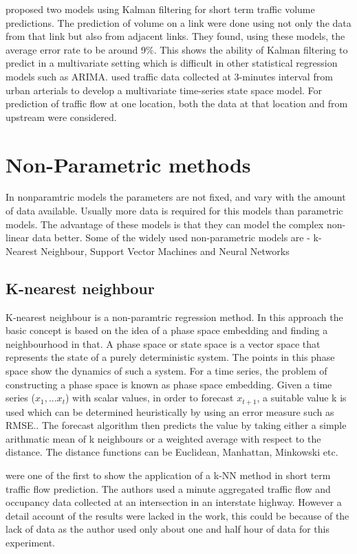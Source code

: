 \citet{okutani1984dynamic} proposed two models using Kalman filtering for short term traffic volume
predictions. The prediction of volume on a link were done using not only the data from that link but
also from adjacent links. They found, using these models, the average error rate to be around 9\%.
This shows the ability of Kalman filtering to predict in a multivariate setting which is difficult in
other statistical regression models such as ARIMA. \citet{stathopoulos2003multivariate} used traffic
data collected at 3-minutes interval from urban arterials to develop a multivariate time-series
state space model. For prediction of traffic flow at one location, both the data at that location
and from upstream were considered.

\section{Non-Parametric methods}
In nonparamtric models the parameters are not fixed, and vary with the amount of data available.
Usually more data is required for this models than parametric models. The advantage of these models
is that they can model the complex non-linear data better. Some of the widely used non-parametric
models are - k-Nearest Neighbour, Support Vector Machines and Neural Networks

\subsection{K-nearest neighbour}
K-nearest neighbour is a non-paramtric regression method. In this approach the basic concept is based
on the idea of a phase space embedding and finding a neighbourhood in that. A phase space or state
space is a vector space that represents the state of a purely deterministic system. The points in this
phase space show the dynamics of such a system. For a time series, the problem of constructing a phase
space is known as phase space embedding. Given a time series ($x_{1},...x_{t}$) with scalar values,
in order to forecast $x_{t+1}$, a suitable value k is used which can be determined heuristically by
using an error measure such as RMSE.. The forecast algorithm then predicts the value by taking either
a simple arithmatic mean of k neighbours or a weighted average with respect to the distance. The
distance functions can be Euclidean, Manhattan, Minkowski etc.

\citet{davis1991nonparametric} were one of the first to show the application of a k-NN method in short
term traffic flow prediction. The authors used a minute aggregated traffic flow and occupancy data
collected at an intersection in an interstate highway. However a detail account of the results were
lacked in the work, this could be because of the lack of data as the author used only about one and
half hour of data for this experiment.

